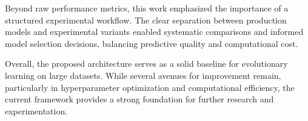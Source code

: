 \documentclass[12pt,a4paper]{article}
\begin{document}
Beyond raw performance metrics, this work emphasized the importance of a structured experimental workflow. The clear separation between production models and experimental variants enabled systematic comparisons and informed model selection decisions, balancing predictive quality and computational cost.

Overall, the proposed architecture serves as a solid baseline for evolutionary learning on large datasets. While several avenues for improvement remain, particularly in hyperparameter optimization and computational efficiency, the current framework provides a strong foundation for further research and experimentation.
\end{document}
